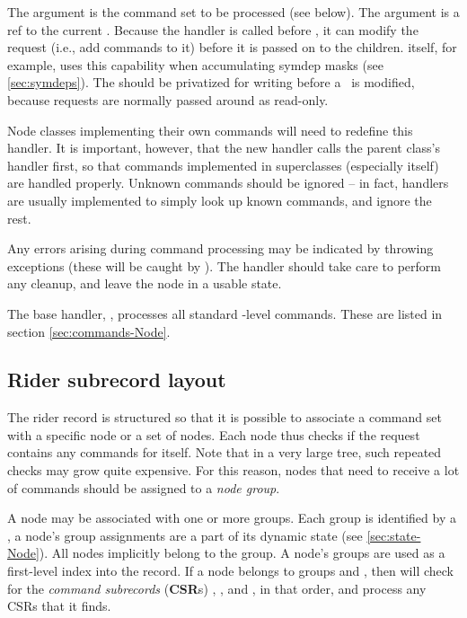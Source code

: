   The  argument is the command set to be processed (see below). The
   argument is a ref to the current \Request. Because the
   handler is called before , it can
  modify the request (i.e., add commands to it) before it is passed on to the
  children.  itself, for example, uses this capability when
  accumulating symdep masks (see \ref{sec:symdeps}). The  should be
  privatized for writing before a \Request\ is modified, because requests are
  normally passed around as read-only.

  Node classes implementing their own commands will need to redefine this
  handler. It is important, however, that the new handler calls the parent
  class's handler first, so that commands implemented in superclasses
  (especially  itself) are handled properly. Unknown commands should
  be ignored -- in fact, handlers are usually implemented to simply look up
  known commands, and ignore the rest.
  
  Any errors arising during command processing may be indicated by throwing
  exceptions (these will be caught by ). The handler should take
  care to perform any cleanup, and leave the node in a usable state.

  The base handler, , processes all standard
  -level commands. These are listed in section
  \ref{sec:commands-Node}.

\subsection{Rider subrecord layout}
  
  The rider record is structured so that it is possible to associate a command
  set with a specific node or a set of nodes. Each node thus checks if the
  request contains any commands for itself. Note that in a very large tree,
  such repeated checks may grow quite expensive. For this reason, nodes that
  need to receive a lot of commands should be assigned to a {\em node group}. 

  A node may be associated with one or more groups. Each group is identified by
  a , a node's group assignments are a part of its dynamic state (see
  \ref{sec:state-Node}). All nodes implicitly belong to the  group. A
  node's groups are used as a first-level index into the  record. If
  a node belongs to groups  and , then 
  will check for the {\em command subrecords}\/ ({\bf CSR}s) ,
  , and , in that order, and process any CSRs that
  it finds.

